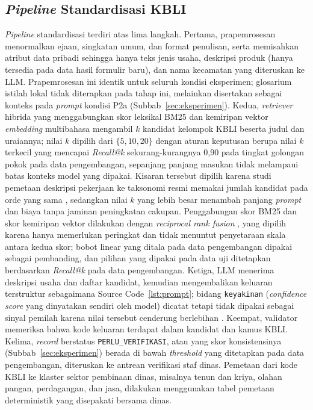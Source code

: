 \subsection{\textit{Pipeline} Standardisasi KBLI}

\textit{Pipeline} standardisasi terdiri atas lima langkah. Pertama, prapemrosesan menormalkan ejaan, singkatan umum, dan format penulisan, serta memisahkan atribut data pribadi sehingga hanya teks jenis usaha, deskripsi produk (hanya tersedia pada data hasil formulir baru), dan nama kecamatan yang diteruskan ke LLM. Prapemrosesan ini identik untuk seluruh kondisi eksperimen; glosarium istilah lokal tidak diterapkan pada tahap ini, melainkan disertakan sebagai konteks pada \textit{prompt} kondisi P2a (Subbab~\ref{sec:eksperimen}). Kedua, \textit{retriever} hibrida yang menggabungkan skor leksikal BM25 dan kemiripan vektor \textit{embedding} multibahasa mengambil $k$ kandidat kelompok KBLI beserta judul dan uraiannya; nilai $k$ dipilih dari $\{5, 10, 20\}$ dengan aturan keputusan berupa nilai $k$ terkecil yang mencapai \textit{Recall@k} sekurang-kurangnya 0,90 pada tingkat golongan pokok pada data pengembangan, sepanjang panjang masukan tidak melampaui batas konteks model yang dipakai. Kisaran tersebut dipilih karena studi pemetaan deskripsi pekerjaan ke taksonomi resmi memakai jumlah kandidat pada orde yang sama \cite{achananuparp2025occupation}, sedangkan nilai $k$ yang lebih besar menambah panjang \textit{prompt} dan biaya tanpa jaminan peningkatan cakupan. Penggabungan skor BM25 dan skor kemiripan vektor dilakukan dengan \textit{reciprocal rank fusion} \cite{cormack2009rrf}, yang dipilih karena hanya memerlukan peringkat dan tidak menuntut penyetaraan skala antara kedua skor; bobot linear yang ditala pada data pengembangan dipakai sebagai pembanding, dan pilihan yang dipakai pada data uji ditetapkan berdasarkan \textit{Recall@k} pada data pengembangan. Ketiga, LLM menerima deskripsi usaha dan daftar kandidat, kemudian mengembalikan keluaran terstruktur sebagaimana Source Code~\ref{lst:prompt}; bidang \texttt{keyakinan} (\textit{confidence score} yang dinyatakan sendiri oleh model) dicatat tetapi tidak dipakai sebagai sinyal pemilah karena nilai tersebut cenderung berlebihan \cite{xiong2024calibration}. Keempat, validator memeriksa bahwa kode keluaran terdapat dalam kandidat dan kamus KBLI. Kelima, \textit{record} berstatus \texttt{PERLU\_VERIFIKASI}, atau yang skor konsistensinya (Subbab~\ref{sec:eksperimen}) berada di bawah \textit{threshold} yang ditetapkan pada data pengembangan, diteruskan ke antrean verifikasi staf dinas. Pemetaan dari kode KBLI ke klaster sektor pembinaan dinas, misalnya tenun dan kriya, olahan pangan, perdagangan, dan jasa, dilakukan menggunakan tabel pemetaan deterministik yang disepakati bersama dinas.

